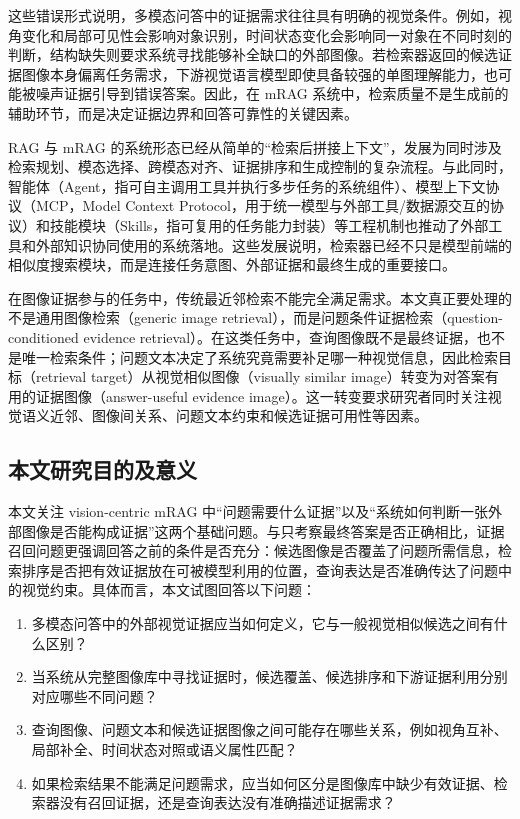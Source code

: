 这些错误形式说明，多模态问答中的证据需求往往具有明确的视觉条件。例如，视角变化和局部可见性会影响对象识别，时间状态变化会影响同一对象在不同时刻的判断，结构缺失则要求系统寻找能够补全缺口的外部图像。若检索器返回的候选证据图像本身偏离任务需求，下游视觉语言模型即使具备较强的单图理解能力，也可能被噪声证据引导到错误答案。因此，在 mRAG 系统中，检索质量不是生成前的辅助环节，而是决定证据边界和回答可靠性的关键因素。

RAG 与 mRAG 的系统形态已经从简单的“检索后拼接上下文”，发展为同时涉及检索规划、模态选择、跨模态对齐、证据排序和生成控制的复杂流程\cite{mei2025multimodalrag,abootorabi2025ask}。与此同时，智能体（Agent，指可自主调用工具并执行多步任务的系统组件）、模型上下文协议（MCP，Model Context Protocol，用于统一模型与外部工具/数据源交互的协议）和技能模块（Skills，指可复用的任务能力封装）等工程机制也推动了外部工具和外部知识协同使用的系统落地\cite{wang2023agent,anthropic2024mcp,anthropic2024claudecode,langchain2024skills}。这些发展说明，检索器已经不只是模型前端的相似度搜索模块，而是连接任务意图、外部证据和最终生成的重要接口。

在图像证据参与的任务中，传统最近邻检索不能完全满足需求。本文真正要处理的不是通用图像检索（generic image retrieval），而是问题条件证据检索（question-conditioned evidence retrieval）。在这类任务中，查询图像既不是最终证据，也不是唯一检索条件；问题文本决定了系统究竟需要补足哪一种视觉信息，因此检索目标（retrieval target）从视觉相似图像（visually similar image）转变为对答案有用的证据图像（answer-useful evidence image）。这一转变要求研究者同时关注视觉语义近邻、图像间关系、问题文本约束和候选证据可用性等因素\cite{radford2021clip,zhang2024magiclens}。

\subsection{本文研究目的及意义}

本文关注 vision-centric mRAG 中“问题需要什么证据”以及“系统如何判断一张外部图像是否能构成证据”这两个基础问题。与只考察最终答案是否正确相比，证据召回问题更强调回答之前的条件是否充分：候选图像是否覆盖了问题所需信息，检索排序是否把有效证据放在可被模型利用的位置，查询表达是否准确传达了问题中的视觉约束。具体而言，本文试图回答以下问题：
\begin{enumerate}[leftmargin=2em]
\item 多模态问答中的外部视觉证据应当如何定义，它与一般视觉相似候选之间有什么区别？
\item 当系统从完整图像库中寻找证据时，候选覆盖、候选排序和下游证据利用分别对应哪些不同问题？
\item 查询图像、问题文本和候选证据图像之间可能存在哪些关系，例如视角互补、局部补全、时间状态对照或语义属性匹配？
\item 如果检索结果不能满足问题需求，应当如何区分是图像库中缺少有效证据、检索器没有召回证据，还是查询表达没有准确描述证据需求？
\end{enumerate}

